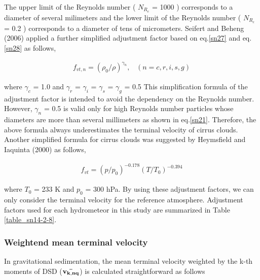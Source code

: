 The upper limit of the Reynolds number ( $N_{R_{e}}$ = 1000 ) corresponds to a diameter of several milimeters and the lower limit of the Reynolds number ( $N_{R_{e}}$ = 0.2 ) corresponds to a diameter of tens of micrometers. Seifert and Beheng (2006) applied a further simplified adjustment factor based on eq.\ref{sn27} and eq.\ref{sn28} as follows,

\begin{eqnarray}
f_{vt,n}=(\rho_{0}/\rho)^{\gamma_{n}}, \;\;\;(n=c,r,i,s,g)
\label{sn30}
\end{eqnarray}

where $\gamma_{c}$ = 1.0 and $\gamma_{r}$ = $\gamma_{i}$ = $\gamma_{s}$ = $\gamma_{g}$ = 0.5 This simplification formula of the adjustment factor is intended to avoid the dependency on the Reynolds number. However, $\gamma_{n}$ = 0.5 is valid only for high Reynolds number particles whose diameters are more than several millimeters as shown in eq.\ref{sn21}. Therefore, the above formula always underestimates the terminal velocity of cirrus clouds. Another simplified formula for cirrus clouds was suggested by Heymsfield and Iaquinta (2000) as follows,

\begin{eqnarray}
f_{vt}=(p/p_{0})^{-0.178}(T/T_{0})^{-0.394}
\label{sn31}
\end{eqnarray}

where $T_{0}$ = 233 K and $p_{0}$ = 300 hPa. By using these adjustment factors, we can only consider the terminal velocity for the reference atmosphere. Adjustment factors used for each hydrometeor in this study are summarized in Table \ref{table_sn14-2-8}.

\begin{table}[h]
\begin{center}
\caption{Adjustment factor for the reference terminal velocity.}
\label{table_sn14-2-8}
\end{center}
\end{table}


\subsubsection{Weightend mean terminal velocity}
In gravitational sedimentation, the mean terminal velocity weighted by the k-th moments of DSD (${\bf \bar{v_{k,nq}}}$) is calculated straightforward as follows

